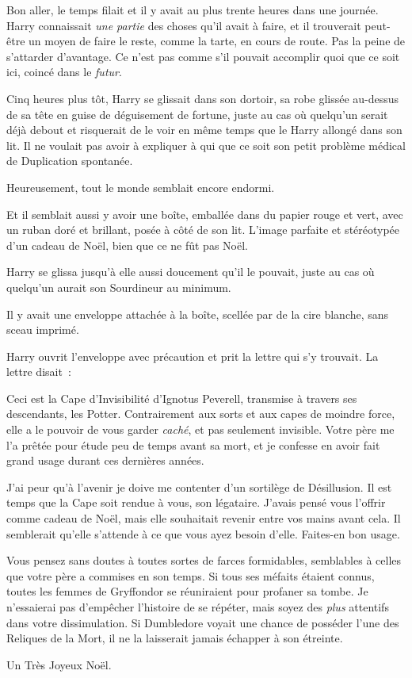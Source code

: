 Bon aller, le temps filait et il y avait au plus trente heures dans une journée. Harry connaissait \emph{une partie} des choses qu'il avait à faire, et il trouverait peut-être un moyen de faire le reste, comme la tarte, en cours de route. Pas la peine de s'attarder d'avantage. Ce n'est pas comme s'il pouvait accomplir quoi que ce soit ici, coincé dans le \emph{futur}.

\later


Cinq heures plus tôt, Harry se glissait dans son dortoir, sa robe glissée au-dessus de sa tête en guise de déguisement de fortune, juste au cas où quelqu'un serait déjà debout et risquerait de le voir en même temps que le Harry allongé dans son lit. Il ne voulait pas avoir à expliquer à qui que ce soit son petit problème médical de Duplication spontanée.

Heureusement, tout le monde semblait encore endormi.

Et il semblait aussi y avoir une boîte, emballée dans du papier rouge et vert, avec un ruban doré et brillant, posée à côté de son lit. L'image parfaite et stéréotypée d'un cadeau de Noël, bien que ce ne fût pas Noël.

Harry se glissa jusqu'à elle aussi doucement qu'il le pouvait, juste au cas où quelqu'un aurait son Sourdineur au minimum.

Il y avait une enveloppe attachée à la boîte, scellée par de la cire blanche, sans sceau imprimé.

Harry ouvrit l'enveloppe avec précaution et prit la lettre qui s'y trouvait. La lettre disait~:
\begin{writtenNote}

Ceci est la Cape d'Invisibilité d'Ignotus Peverell, transmise à travers ses descendants, les Potter. Contrairement aux sorts et aux capes de moindre force, elle a le pouvoir de vous garder \emph{caché}, et pas seulement invisible. Votre père me l'a prêtée pour étude peu de temps avant sa mort, et je confesse en avoir fait grand usage durant ces dernières années.

J'ai peur qu'à l'avenir je doive me contenter d'un sortilège de Désillusion. Il est temps que la Cape soit rendue à vous, son légataire. J'avais pensé vous l'offrir comme cadeau de Noël, mais elle souhaitait revenir entre vos mains avant cela. Il semblerait qu'elle s'attende à ce que vous ayez besoin d'elle. Faites-en bon usage.

Vous pensez sans doutes à toutes sortes de farces formidables, semblables à celles que votre père a commises en son temps. Si tous ses méfaits étaient connus, toutes les femmes de Gryffondor se réuniraient pour profaner sa tombe. Je n'essaierai pas d'empêcher l'histoire de se répéter, mais soyez des \emph{plus} attentifs dans votre dissimulation. Si Dumbledore voyait une chance de posséder l'une des Reliques de la Mort, il ne la laisserait jamais échapper à son étreinte.

Un Très Joyeux Noël.

\end{writtenNote}


